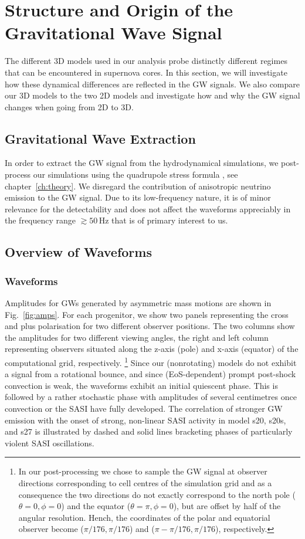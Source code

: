 \section{Structure and Origin of the Gravitational Wave Signal}
\label{sec:structure}
{The different 3D models used in our analysis probe distinctly
different regimes that can be encountered in supernova cores.
In this section, we will investigate how these dynamical differences are reflected
in the GW signals. We also compare our 3D models to the two 2D models and investigate
how and why the GW signal changes when going from 2D to 3D.}
\subsection{Gravitational Wave Extraction}
In order to extract the GW signal from
the hydrodynamical simulations, we post-process our simulations using
the quadrupole stress formula \citep{finn_89,nakamura_89,blanchet_90}, see
chapter~\ref{ch:theory}. 
We disregard the contribution of anisotropic neutrino
emission \citep{epstein_78} to the GW signal. Due
to its low-frequency nature, it is of minor relevance for the
detectability and does not affect the waveforms appreciably
in the frequency range $\gtrsim 50 \, \mathrm{Hz}$ that is of
primary interest to us.

\subsection{Overview of Waveforms}
\subsubsection{Waveforms}
\label{sec:waveforms}
Amplitudes for GWs generated by asymmetric mass motions are shown in
Fig.~\ref{fig:amps}. For each progenitor, we show two panels
representing the cross and plus polarisation for two different
observer positions. The two columns show the amplitudes for two 
different viewing angles, the right and left column representing
observers situated along the z-axis (pole) and x-axis (equator) of the computational grid, respectively.
\footnote{In our post-processing we chose to sample the GW signal at observer directions corresponding to 
cell centres of the simulation grid and as a consequence the two directions do not exactly correspond to the
north pole ($\theta = 0, \phi = 0$) and the equator ($\theta = \pi, \phi = 0$), but are offset by half of the angular resolution.
Hench, the coordinates of the polar and equatorial observer become ($\pi/176,\pi/176$) 
and ($\pi - \pi/176,\pi/176$), respectively.}
Since our (nonrotating) models do not exhibit a signal from a rotational bounce,
and since (EoS-dependent) prompt post-shock convection is weak, 
the waveforms exhibit an initial quiescent phase. This is followed by a rather 
stochastic phase with amplitudes of several centimetres once convection or the SASI have fully developed. 
The correlation of stronger GW emission
with the onset of strong, non-linear SASI activity
in model s20, s20s, and s27 is illustrated
by dashed and solid lines bracketing phases of particularly
violent SASI oscillations.

